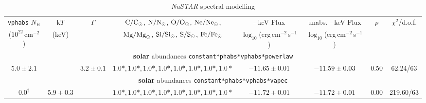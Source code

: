 \begin{table*}
        \centering
        \caption{{\em NuSTAR} spectral modelling}
        \label{tab:nustarspecmodels}
        \begin{tabular}{@{~}c@{~~}c@{~~}c@{~~}c@{~~}c@{~~}c@{~~}c@{~~}c@{~}} 
                \hline
\texttt{vphabs} $N_\mathrm{H}$  & k$T$  & $\Gamma$ & ${\rm C}/{\rm C}_{\odot}$, ${\rm N}/{\rm N}_{\odot}$, ${\rm O}/{\rm O}_{\odot}$, ${\rm Ne}/{\rm Ne}_{\odot}$,      & \nustarenergylow{}--\nustarenergyhigh{}\,keV Flux                    & unabs. \nustarenergylow{}--\nustarenergyhigh{}\,keV Flux             & $p$ & $\chi^2$/d.o.f.\\
($10^{22}$\,cm$^{-2}$)          & (keV) &          & ${\rm Mg}/{\rm Mg}_{\odot}$, ${\rm Si}/{\rm Si}_{\odot}$, ${\rm S}/{\rm S}_{\odot}$, ${\rm Fe}/{\rm Fe}_{\odot}$  & $\log_{10}$(erg\,cm$^{-2}$\,s$^{-1}$)  & $\log_{10}$(erg\,cm$^{-2}$\,s$^{-1}$)  &     &             \\ 
                \hline


\multicolumn{8}{c}{{\bf solar} abundances \texttt{constant*phabs*vphabs*powerlaw}} \\
$5.0 \pm 2.1 $ & $  $ & $3.2 \pm 0.1 $ & $1.0*, 1.0*, 1.0*, 1.0*, 1.0*, 1.0*, 1.0*, 1.0* $ & $-11.65 \pm 0.01 $ & $-11.59 \pm 0.03 $ & 0.50 & 62.24/63 \\

\multicolumn{8}{c}{{\bf solar} abundances \texttt{constant*phabs*vphabs*vapec}} \\
$0.0^\dagger$ & $5.9 \pm 0.3 $ & $ $ & $1.0*, 1.0*, 1.0*, 1.0*, 1.0*, 1.0*, 1.0*, 1.0* $ & $-11.72 \pm 0.01 $ & $-11.72 \pm 0.01 $ & 0.00 & 219.60/63 \\




\end{tabular}
\end{table*}
